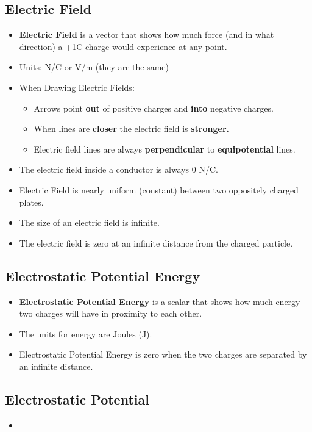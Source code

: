 \documentclass[letterpaper, 12pt]{article}
\begin{document}
\subsection*{Electric Field}
\begin{itemize}
	\item \textbf{Electric Field} is a vector that shows how much force (and in what direction) a +1C charge would experience at any point.
	\item Units: N/C or V/m (they are the same)
	\item When Drawing Electric Fields:
		\begin{itemize}
			\item Arrows point \textbf{out} of positive charges and \textbf{into} negative charges. 
			\item When lines are \textbf{closer} the electric field is \textbf{stronger.}
			\item Electric field lines are always \textbf{perpendicular} to \textbf{equipotential} lines. 
		\end{itemize}
	\item The electric field inside a conductor is always 0 N/C.
	\item Electric Field is nearly uniform (constant) between two oppositely charged plates.
	\item The size of an electric field is infinite. 
	\item The electric field is zero at an infinite distance from the charged particle. 
	\end{itemize}


	
\subsection*{Electrostatic Potential Energy}
	\begin{itemize}
		\item \textbf{Electrostatic Potential Energy} is a scalar that shows how much energy two charges will have in proximity to each other.  
		\item The units for energy are Joules (J). 
		\item Electrostatic Potential Energy is zero when the two charges are separated by an infinite distance. 
	\end{itemize}

	
	


	
\subsection*{Electrostatic Potential}
\begin{itemize}
\item
	
\end{itemize}

 
\end{document}
